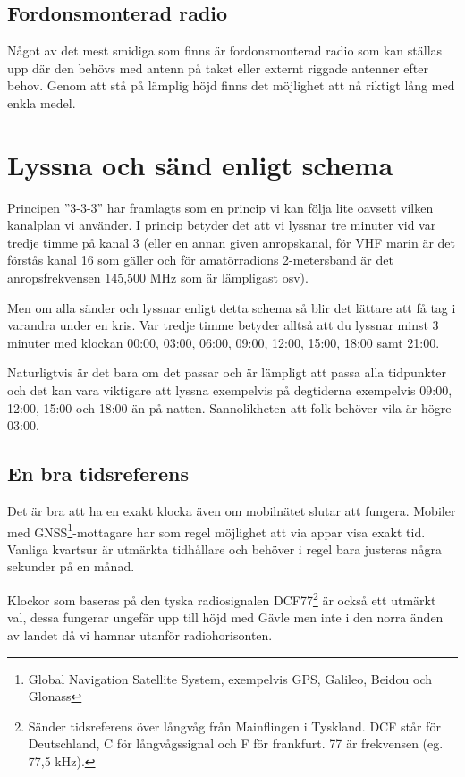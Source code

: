 \subsection{Fordonsmonterad radio}

Något av det mest smidiga som finns är fordonsmonterad radio som kan ställas
upp där den behövs med antenn på taket eller externt riggade antenner efter
behov. Genom att stå på lämplig höjd finns det möjlighet att nå riktigt lång
med enkla medel.

\section{Lyssna och sänd enligt schema}


Principen ''3-3-3'' har framlagts som en princip vi kan följa lite oavsett vilken
kanalplan vi använder. I princip betyder det att vi lyssnar tre minuter vid
var tredje timme på kanal 3 (eller en annan given anropskanal, för VHF marin
är det förstås kanal 16 som gäller och för amatörradions 2-metersband är det
anropsfrekvensen 145,500 MHz som är lämpligast osv).

Men om alla sänder och lyssnar enligt detta schema så blir det lättare att få
tag i varandra under en kris. Var tredje timme betyder alltså att du lyssnar
minst 3 minuter med klockan 00:00, 03:00, 06:00, 09:00, 12:00, 15:00, 18:00
samt 21:00.

Naturligtvis är det bara om det passar och är lämpligt att passa alla
tidpunkter och det kan vara viktigare att lyssna exempelvis på degtiderna
exempelvis 09:00, 12:00, 15:00 och 18:00 än på natten. Sannolikheten att folk
behöver vila är högre 03:00.

\subsection{En bra tidsreferens}

Det är bra att ha en exakt klocka även om mobilnätet slutar att fungera.
Mobiler med GNSS\footnote{Global Navigation Satellite System, exempelvis GPS,
Galileo, Beidou och Glonass}-mottagare har som regel möjlighet att via appar
visa exakt tid. Vanliga kvartsur är utmärkta tidhållare och behöver i regel
bara justeras några sekunder på en månad.

Klockor som baseras på den tyska radiosignalen DCF77\footnote{Sänder
tidsreferens över långvåg från Mainflingen i Tyskland. DCF står för
Deutschland, C för långvågssignal och F för frankfurt. 77 är frekvensen (eg.
77,5 kHz).} är också ett utmärkt val, dessa fungerar ungefär upp till höjd med
Gävle men inte i den norra änden av landet då vi hamnar utanför
radiohorisonten.


